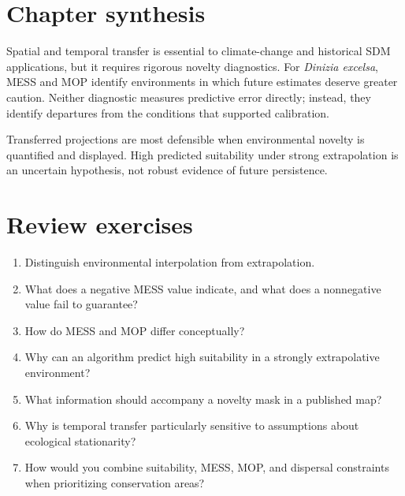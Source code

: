 
\section{Chapter synthesis}

Spatial and temporal transfer is essential to climate-change and historical SDM applications, but it requires rigorous novelty diagnostics. For \textit{Dinizia excelsa}, MESS and MOP identify environments in which future estimates deserve greater caution. Neither diagnostic measures predictive error directly; instead, they identify departures from the conditions that supported calibration.

\begin{conceito}[title={\faBook\quad Key message}]
Transferred projections are most defensible when environmental novelty is quantified and displayed. High predicted suitability under strong extrapolation is an uncertain hypothesis, not robust evidence of future persistence.
\end{conceito}

\section{Review exercises}

\begin{enumerate}
\item Distinguish environmental interpolation from extrapolation.
\item What does a negative MESS value indicate, and what does a nonnegative value fail to guarantee?
\item How do MESS and MOP differ conceptually?
\item Why can an algorithm predict high suitability in a strongly extrapolative environment?
\item What information should accompany a novelty mask in a published map?
\item Why is temporal transfer particularly sensitive to assumptions about ecological stationarity?
\item How would you combine suitability, MESS, MOP, and dispersal constraints when prioritizing conservation areas?
\end{enumerate}

